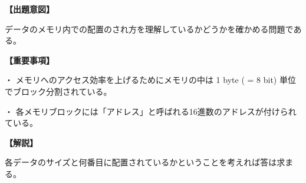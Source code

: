 \noindent \textbf{【出題意図】}

\noindent データのメモリ内での配置のされ方を理解しているかどうかを確かめる問題である。

\vspace{1em}
\noindent \textbf{【重要事項】}

\medskip
\noindent ・ メモリへのアクセス効率を上げるためにメモリの中は 1 byte ( = 8 bit) 単位でブロック分割されている。

\medskip
\noindent ・ 各メモリブロックには「アドレス」と呼ばれる16進数のアドレスが付けられている。

\vspace{1em}
\noindent \textbf{【解説】}

\noindent 各データのサイズと何番目に配置されているかということを考えれば答は求まる。
